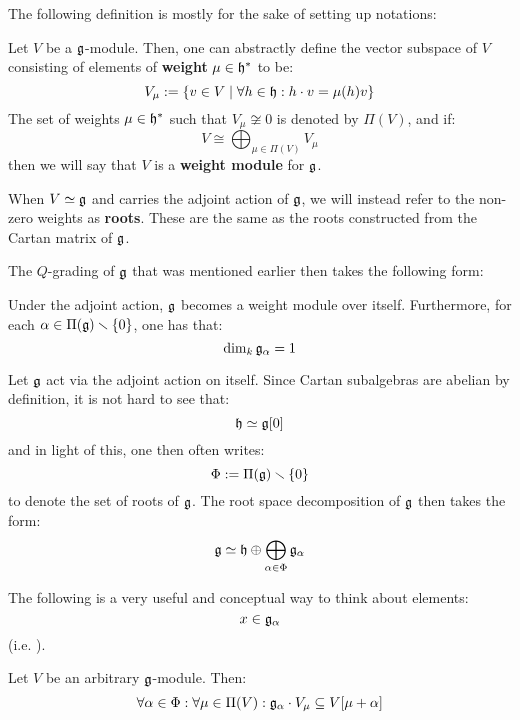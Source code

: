         The following definition is mostly for the sake of setting up notations:
        \begin{definition}
            Let $V$ be a $\mathfrak{g}$-module. Then, one can abstractly define the vector subspace of $V$ consisting of elements of \textbf{weight} $\mu \in \mathfrak{h}^*$ to be:
                $$V_{\mu} := \{v \in V \mid \forall h \in \mathfrak{h}: h \cdot v = \mu(h) v\}$$
            The set of weights $\mu \in \mathfrak{h}^*$ such that $V_{\mu} \not \cong 0$ is denoted by $\Pi(V)$, and if:
                $$V \cong \bigoplus_{\mu \in \Pi(V)} V_{\mu}$$
            then we will say that $V$ is a \textbf{weight module} for $\mathfrak{g}$. 

            When $V \simeq \mathfrak{g}$ and carries the adjoint action of $\mathfrak{g}$, we will instead refer to the non-zero weights as \textbf{roots}. These are the same as the roots constructed from the Cartan matrix of $\mathfrak{g}$.
        \end{definition}
        The $Q$-grading of $\mathfrak{g}$ that was mentioned earlier then takes the following form:
        \begin{theorem} \label{theorem: root_space_decomposition_for_finite_dimensional_simple_lie_algebras}
            Under the adjoint action, $\mathfrak{g}$ becomes a weight module over itself. Furthermore, for each $\alpha \in \Pi(\mathfrak{g}) \smallsetminus \{0\}$, one has that:
                $$\dim_k \mathfrak{g}_{\alpha} = 1$$
        \end{theorem}
        \begin{convention}
            Let $\mathfrak{g}$ act via the adjoint action on itself. Since Cartan subalgebras are abelian by definition, it is not hard to see that:
                $$\mathfrak{h} \simeq \mathfrak{g}[0]$$
            and in light of this, one then often writes:
                $$\Phi := \Pi(\mathfrak{g}) \smallsetminus \{0\}$$
            to denote the set of roots of $\mathfrak{g}$. The root space decomposition of $\mathfrak{g}$ then takes the form:
                $$\mathfrak{g} \simeq \mathfrak{h} \oplus \bigoplus_{\alpha \in \Phi} \mathfrak{g}_{\alpha}$$
        \end{convention}
        The following is a very useful and conceptual way to think about elements:
            $$x \in \mathfrak{g}_{\alpha}$$
        (i.e. ). 
        \begin{lemma}
            Let $V$ be an arbitrary $\mathfrak{g}$-module. Then:
                $$\forall \alpha \in \Phi: \forall \mu \in \Pi(V): \mathfrak{g}_{\alpha} \cdot V_{\mu} \subseteq V[\mu + \alpha]$$
        \end{lemma}
